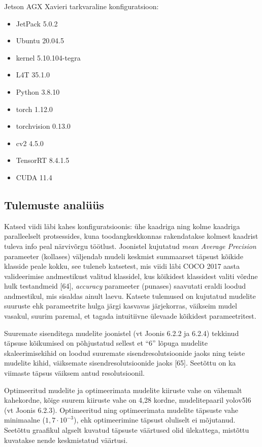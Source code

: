 \documentclass[12pt,a4paper]{report}
\begin{document}
Jetson AGX Xavieri tarkvaraline konfiguratsioon:

\begin{itemize}
\item
  JetPack 5.0.2
\item
  Ubuntu 20.04.5
\item
  kernel 5.10.104-tegra
\item
  L4T 35.1.0
\item
  Python 3.8.10
\item
  torch 1.12.0
\item
  torchvision 0.13.0
\item
  cv2 4.5.0
\item
  TensorRT 8.4.1.5
\item
  CUDA 11.4
\end{itemize}

\subsection{Tulemuste analüüs}\label{tulemuste-analuxfcuxfcs}

Katsed viidi läbi kahes konfiguratsioonis: ühe kaadriga ning kolme kaadriga paralleelselt protsessides, kuna toodangkeskkonnas rakendatakse kolmest kaadrist tuleva info peal närvivõrgu töötlust. Joonistel kujutatud \emph{mean Average Precision} parameeter (kollases) väljendab mudeli keskmist summaarset täpsust kõikide klasside peale kokku, see tuleneb katsetest, mis viidi läbi COCO 2017 aasta valideerimise andmestikust valitud klassidel, kus kõikidest klassidest valiti võrdne hulk testandmeid {[}64{]}, \emph{accuracy} parameeter (punases) saavutati eraldi loodud andmestikul, mis sisaldas ainult laevu. Katsete tulemused on kujutatud mudelite suuruste ehk parameetrite hulga järgi kasvavas järjekorras, väikseim mudel vasakul, suurim paremal, et tagada intuitiivne ülevaade kõikidest parameetritest.

Suuremate sisenditega mudelite joonistel (vt Joonis 6.2.2 ja 6.2.4) tekkinud täpsuse kõikumised on põhjustatud sellest et ``6'' lõpuga mudelite skaleerimisekihid on loodud suuremate sisendresolutsioonide jaoks ning teiste mudelite kihid, väiksemate sisendresolutsioonide jaoks {[}65{]}. Seetõttu on ka viimaste täpsus väiksem antud resolutsioonil.

Optimeeritud mudelite ja optimeerimata mudelite kiiruste vahe on vähemalt kahekordne, kõige suurem kiiruste vahe on 4,28 kordne, mudelitepaaril yolov5l6 (vt Joonis 6.2.3). Optimeeritud ning optimeerimata mudelite täpsuste vahe minimaalne (\({1,7 \cdot 10}^{- 3}\)), ehk optimeerimine täpsust oluliselt ei mõjutanud. Seetõttu graafikul algselt kuvatud täpsuste väärtused olid ülekattega, mistõttu kuvatakse nende keskmistatud väärtusi.
\end{document}
